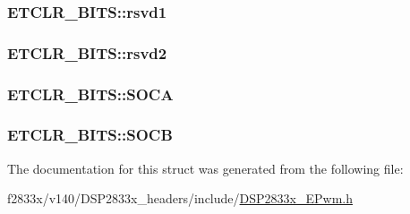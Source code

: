 \subsubsection[{rsvd1}]{ E\+T\+C\+L\+R\+\_\+\+B\+I\+T\+S\+::rsvd1}\label{struct_e_t_c_l_r___b_i_t_s_a582c71a711e4b704d259ab256b9677d0}
\hypertarget{struct_e_t_c_l_r___b_i_t_s_a262c31e7a22f46dab5bfb74f104c9aec}{}
\subsubsection[{rsvd2}]{ E\+T\+C\+L\+R\+\_\+\+B\+I\+T\+S\+::rsvd2}\label{struct_e_t_c_l_r___b_i_t_s_a262c31e7a22f46dab5bfb74f104c9aec}
\hypertarget{struct_e_t_c_l_r___b_i_t_s_a3922cb8e413915cb0eff6138c5fdfe80}{}
\subsubsection[{S\+O\+C\+A}]{ E\+T\+C\+L\+R\+\_\+\+B\+I\+T\+S\+::\+S\+O\+C\+A}\label{struct_e_t_c_l_r___b_i_t_s_a3922cb8e413915cb0eff6138c5fdfe80}
\hypertarget{struct_e_t_c_l_r___b_i_t_s_a025a3c7cd5ed79701addf5fb90990176}{}
\subsubsection[{S\+O\+C\+B}]{ E\+T\+C\+L\+R\+\_\+\+B\+I\+T\+S\+::\+S\+O\+C\+B}\label{struct_e_t_c_l_r___b_i_t_s_a025a3c7cd5ed79701addf5fb90990176}


The documentation for this struct was generated from the following file\+:\begin{DoxyCompactItemize}
\item 
f2833x/v140/\+D\+S\+P2833x\+\_\+headers/include/\hyperlink{_d_s_p2833x___e_pwm_8h}{D\+S\+P2833x\+\_\+\+E\+Pwm.\+h}\end{DoxyCompactItemize}
